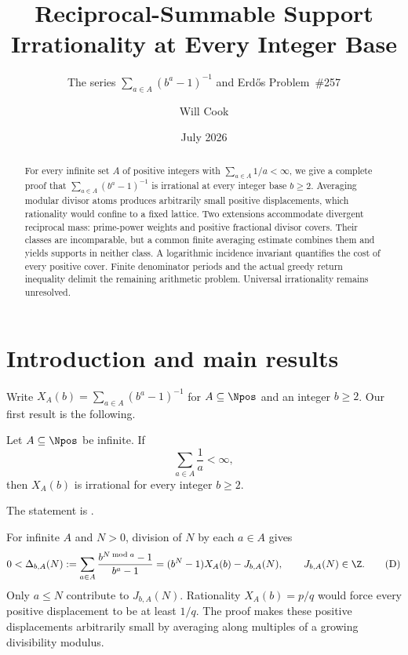 \documentclass[11pt]{article}
\title{Reciprocal-Summable Support Irrationality at Every Integer Base}
\subtitle{The series $\sum_{a\in A}(b^a-1)^{-1}$ and Erd\H{o}s Problem~\#257}
\author{Will Cook}
\date{July 2026}
\begin{document}
\maketitle
\noteprovenance

\begin{abstract}
For every infinite set $A$ of positive integers with $\sum_{a\in A}1/a<\infty$,
we give a complete proof that $\sum_{a\in A}(b^a-1)^{-1}$ is irrational
at every integer base $b\ge2$.  Averaging modular divisor atoms produces
arbitrarily small positive displacements, which rationality would confine
to a fixed lattice.  Two extensions accommodate divergent reciprocal mass:
prime-power weights and positive fractional divisor covers.  Their classes
are incomparable, but a common finite averaging estimate combines them
and yields supports in neither class.  A logarithmic incidence invariant
quantifies the cost of every positive cover.  Finite denominator periods
and the actual greedy return inequality delimit the remaining arithmetic
problem.  Universal irrationality remains unresolved.
\end{abstract}

\section{Introduction and main results}\label{sec:problem}
Write $X_A(b)=\sum_{a\in A}(b^a-1)^{-1}$ for $A\subseteq\Npos$ and an
integer $b\ge2$.  Our first result is the following.

\begin{theorem}\label{res:reciprocal-support}
Let $A\subseteq\Npos$ be infinite.  If
\[
  \sum_{a\in A}\frac1a<\infty,
\]
then \(X_A(b)\) is irrational for every integer \(b\ge2\).
\end{theorem}

The statement is
\href{https://github.com/wcook04/plectis-erdos/blob/f36a98bf3d3e6f65f1074e3b800e3293d5b8a51a/Erdos249257/AllBaseReciprocalSupportIrrationality.lean#L395}{}.

For infinite $A$ and $N>0$, division of $N$ by each $a\in A$ gives
\[
 0<\Delta_{b,A}(N)
 :=\sum_{a\in A}\frac{b^{N\bmod a}-1}{b^a-1}
 =(b^N-1)X_A(b)-J_{b,A}(N),\qquad J_{b,A}(N)\in\Z.
 \label{eq:intro-displacement}\tag{D}
\]
Only $a\le N$ contribute to $J_{b,A}(N)$.  Rationality $X_A(b)=p/q$
would force every positive displacement to be at least $1/q$.
The proof makes these positive displacements arbitrarily small by
averaging along multiples of a growing divisibility modulus.
\end{document}
